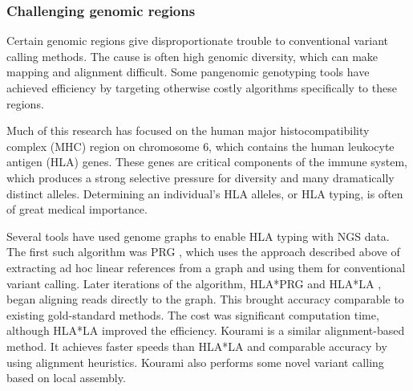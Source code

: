 %

\subsubsection{Challenging genomic regions}

Certain genomic regions give disproportionate trouble to conventional variant calling methods. 
The cause is often high genomic diversity, which can make mapping and alignment difficult. 
Some pangenomic genotyping tools have achieved efficiency by targeting otherwise costly algorithms specifically to these regions.

Much of this research has focused on the human major histocompatibility complex (MHC) region on chromosome 6, which contains the human leukocyte antigen (HLA) genes. 
These genes are critical components of the immune system, which produces a strong selective pressure for diversity and many dramatically distinct alleles.
Determining an individual's HLA alleles, or HLA typing, is often of great medical importance.

Several tools have used genome graphs to enable HLA typing with NGS data.
The first such algorithm was PRG \cite{dilthey2015improved}, which uses the approach described above of extracting ad hoc linear references from a graph and using them for conventional variant calling.
Later iterations of the algorithm, HLA*PRG \cite{dilthey2018hla} and HLA*LA \cite{dilthey2019hla}, began aligning reads directly to the graph.
This brought accuracy comparable to existing gold-standard methods.
The cost was significant computation time, although HLA*LA improved the efficiency.
Kourami \cite{lee2018kourami} is a similar alignment-based method.
It achieves faster speeds than HLA*LA and comparable accuracy by using alignment heuristics.
Kourami also performs some novel variant calling based on local assembly.

